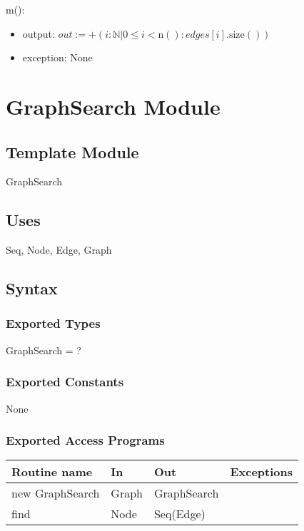 \documentclass[12pt]{article}
\begin{document}
\noindent m():
\begin{itemize}
	\item output: $out := +(i : \mathbb{N} | 0 \le i < \mbox{n}() : \textit{edges}[i].\mbox{size}())$
	\item exception: None
\end{itemize}

\newpage

\section{GraphSearch Module}

\subsection*{Template Module}

GraphSearch

\subsection*{Uses}

Seq, Node, Edge, Graph

\subsection*{Syntax}

\subsubsection*{Exported Types}

GraphSearch = ?

\subsubsection*{Exported Constants}

None

\subsubsection*{Exported Access Programs}

\begin{tabular}{| l | l | l | l |}
	\hline
	\textbf{Routine name} & \textbf{In} & \textbf{Out} & \textbf{Exceptions}\\
	\hline
	new GraphSearch & Graph & GraphSearch & ~\\
	\hline
	find & Node & Seq(Edge) & ~\\
	\hline
\end{tabular}
\end{document}
